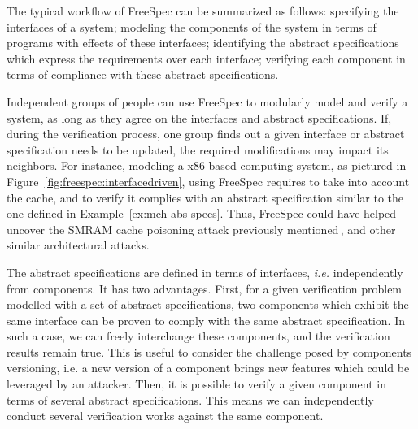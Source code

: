 The typical workflow of FreeSpec can be summarized as follows: specifying the
interfaces of a system; modeling the components of the system in terms of
programs with effects of these interfaces; identifying the abstract
specifications which express the requirements over each interface; verifying
each component in terms of compliance with these abstract specifications.

Independent groups of people can use FreeSpec to modularly model and verify a
system, as long as they agree on the interfaces and abstract specifications.
%
If, during the verification process, one group finds out a given interface or
abstract specification needs to be updated, the required modifications may
impact its neighbors. 
%
For instance, modeling a x86-based computing system, as pictured in
Figure~\ref{fig:freespec:interfacedriven}, using FreeSpec requires to take into
account the cache, and to verify it complies with an abstract specification
similar to the one defined in Example~\ref{ex:mch-abs-specs}.
%
Thus, FreeSpec could have helped uncover the SMRAM cache poisoning attack
previously mentioned\,\cite{wojtczuk2009smram,duflot2009smram}, and other
similar architectural attacks.

The abstract specifications are defined in terms of interfaces, \emph{i.e.}
independently from components.
%
It has two advantages.
%
First, for a given verification problem modelled with a set of abstract
specifications, two components which exhibit the same interface can be proven to
comply with the same abstract specification.
%
In such a case, we can freely interchange these components, and the verification
results remain true.
%
This is useful to consider the challenge posed by components versioning, i.e. a
new version of a component brings new features which could be leveraged by an
attacker.
%
Then, it is possible to verify a given component in terms of several abstract
specifications.
%
This means we can independently conduct several verification works against the
same component.
